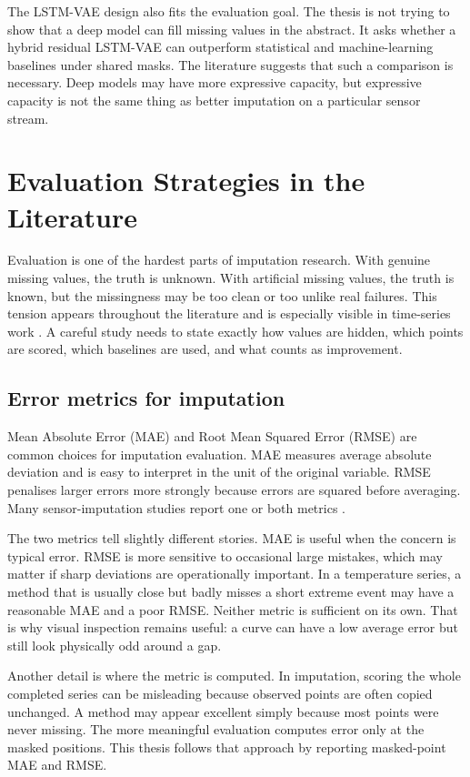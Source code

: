 The LSTM-VAE design also fits the evaluation goal. The thesis is not trying to show that a deep model can fill missing values in the abstract. It asks whether a hybrid residual LSTM-VAE can outperform statistical and machine-learning baselines under shared masks. The literature suggests that such a comparison is necessary. Deep models may have more expressive capacity, but expressive capacity is not the same thing as better imputation on a particular sensor stream.

\section{Evaluation Strategies in the Literature}

Evaluation is one of the hardest parts of imputation research. With genuine missing values, the truth is unknown. With artificial missing values, the truth is known, but the missingness may be too clean or too unlike real failures. This tension appears throughout the literature and is especially visible in time-series work \cite{Farjallah2025EvaluationOM,Toye2025BenchmarkingMD}. A careful study needs to state exactly how values are hidden, which points are scored, which baselines are used, and what counts as improvement.

\subsection{Error metrics for imputation}

Mean Absolute Error (MAE) and Root Mean Squared Error (RMSE) are common choices for imputation evaluation. MAE measures average absolute deviation and is easy to interpret in the unit of the original variable. RMSE penalises larger errors more strongly because errors are squared before averaging. Many sensor-imputation studies report one or both metrics \cite{Agbo2022MissingDI,Choi2021,Lee2025ComparisonOM}.

The two metrics tell slightly different stories. MAE is useful when the concern is typical error. RMSE is more sensitive to occasional large mistakes, which may matter if sharp deviations are operationally important. In a temperature series, a method that is usually close but badly misses a short extreme event may have a reasonable MAE and a poor RMSE. Neither metric is sufficient on its own. That is why visual inspection remains useful: a curve can have a low average error but still look physically odd around a gap.

Another detail is where the metric is computed. In imputation, scoring the whole completed series can be misleading because observed points are often copied unchanged. A method may appear excellent simply because most points were never missing. The more meaningful evaluation computes error only at the masked positions. This thesis follows that approach by reporting masked-point MAE and RMSE.

